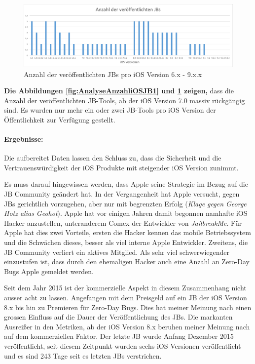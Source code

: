 \begin{figure}[htbp!]
        \centering
                \includegraphics[scale=0.5]{Bilder/iOSJB2.png}
        \caption{Anzahl der veröffentlichten JBs pro iOS Version 6.x - 9.x.x}
        \label{fig:AnalyseAnzahliOSJB2}
\end{figure}

\textbf{Die Abbildungen \ref{fig:AnalyseAnzahliOSJB1} und \ref{fig:AnalyseAnzahliOSJB2} zeigen,} dass die Anzahl der veröffentlichten JB-Tools, ab der iOS Version 7.0 massiv rückgängig sind. Es wurden nur mehr ein oder zwei JB-Tools pro iOS Version der Öffentlichkeit zur Verfügung gestellt. 
\paragraph{Ergebnisse:} Die aufbereitet Daten lassen den Schluss zu, dass die Sicherheit und die Vertrauenswürdigkeit der iOS Produkte mit steigender iOS Version zunimmt. \par 
Es muss darauf hingewissen werden, dass Apple seine Strategie im Bezug auf die JB Community geändert hat. In der Vergangenheit hat Apple versucht, gegen JBs gerichtlich vorzugehen, aber nur mit begrenzten Erfolg (\textit{\glqq Klage gegen George Hotz alias Geohot\grqq{}}). Apple hat vor einigen Jahren damit begonnen namhafte iOS Hacker anzustellen, unteranderem Comex  der Entwickler von \textit{\glqq JailbreakMe\grqq}. Für Apple hat dies zwei Vorteile, ersten die Hacker kennen das mobile Betriebssystem und die Schwächen dieses, besser als viel interne Apple Entwickler.  Zweitens, die JB Community verliert ein aktives Mitglied. Als sehr viel schwerwiegender einzustufen ist, dass durch den ehemaligen Hacker auch eine Anzahl an Zero-Day Bugs Apple gemeldet werden.\par
Seit dem Jahr 2015 ist der kommerzielle Aspekt in diesem Zusammenhang nicht ausser acht zu lassen. Angefangen mit dem Preisgeld auf ein JB der iOS Version 8.x bis hin zu Premieren für Zero-Day Bugs. Dies hat meiner Meinung nach einen grossen Einfluss auf die Dauer der Veröffentlichung des JBs. Die markanten Ausreißer in den Metriken, ab der iOS Version 8.x beruhen meiner Meinung nach auf dem kommerziellen Faktor. Der letzte JB wurde Anfang Dezember 2015 veröffentlicht, seit diesem Zeitpunkt wurden sechs iOS Versionen veröffentlicht und es sind 243 Tage seit es letzten JBs verstrichen.


